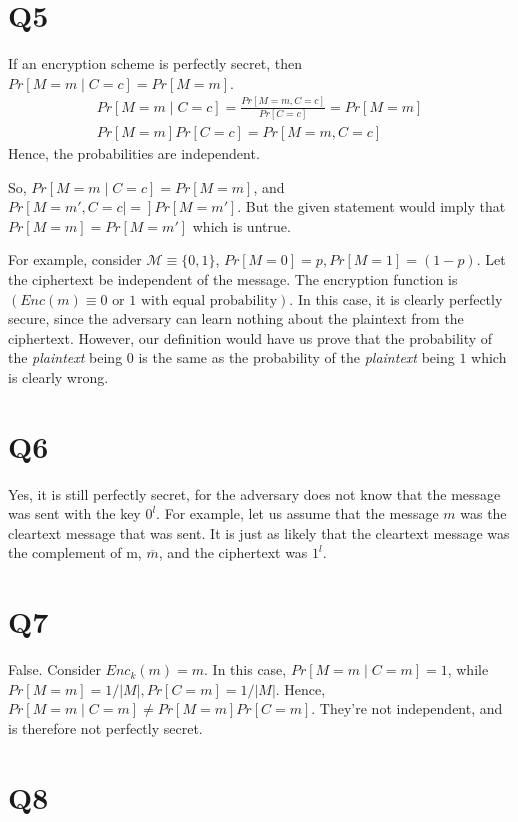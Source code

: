 \documentclass[11pt]{article}
\newcommand{\messagespace}{\mathcal{M}}
\newcommand{\pr}[1]{Pr \left[ #1 \right]}
\newcommand{\prcond}[2]{Pr \left[ #1 \mid #2 \right]}
\begin{document}
\section{Q5}

If an encryption scheme is perfectly secret, then $\prcond{M=m}{C=c} = \pr{M=m}$.
\begin{align*}
    \prcond{M=m}{C=c} = \frac{\pr{M=m, C=c}}{\pr{C=c}} = \pr{M=m} \\
    \pr{M=m}\pr{C=c} = \pr{M=m,C=c}
\end{align*}
Hence, the probabilities are independent.

So, $\prcond{M=m}{C=c} = \pr{M=m}$, and $\prcond{M=m',C=c} = \pr{M=m'}$. But
the given statement would imply that $\pr{M=m} = \pr{M=m'}$ which is untrue.

For example, consider $\messagespace \equiv \{0, 1\}$, $\pr{M=0} = p, \pr{M=1}
= (1 - p)$. Let the ciphertext be independent of the message. The encryption
function is $(Enc(m) \equiv \text{$0$ or $1$ with equal probability})$. In this
case, it is clearly perfectly secure, since the adversary can learn
nothing about the plaintext from the ciphertext.  However, our definition
would have us prove that the probability of the \emph{plaintext} being $0$
is the same as the probability of the \emph{plaintext} being $1$ which
is clearly wrong.


\section{Q6}
Yes, it is still perfectly secret, for the adversary does not know that
the message was sent with the key $0^l$. For example, let us assume
that the message $m$ was the cleartext message that was sent. It is
just as likely that the cleartext message was the complement of m, $\overline{m}$,
and the ciphertext was $1^l$.

\section{Q7}
False. Consider $Enc_k(m) = m$. In this case, $\prcond{M=m}{C=m} = 1$, while
$\pr{M=m} = 1/|M|, \pr{C=m} = 1/|M|$. Hence, $\prcond{M=m}{C=m} \neq \pr{M=m}\pr{C=m}$.
They're not independent, and is therefore not perfectly secret.

\section{Q8}
\end{document}
